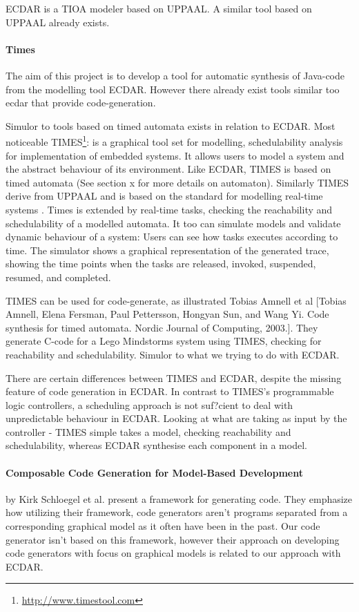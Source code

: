 ECDAR is a TIOA modeler based on UPPAAL. A similar tool based on UPPAAL already
exists.

\paragraph{Times}
The aim of this project is to develop a tool for automatic synthesis of Java-code from the modelling tool ECDAR. However there already exist tools similar too ecdar that provide code-generation.

Simulor to tools based on timed automata exists in relation to ECDAR. Most noticeable TIMES\footnote{\url{http://www.timestool.com}}: is a graphical tool set for modelling, schedulability analysis for implementation of embedded systems. It allows users to model a system and the abstract behaviour of its environment. 
Like ECDAR, TIMES is based on timed automata (See section x for more details on automaton). Similarly TIMES derive from UPPAAL and is based on the standard for modelling real-time systems \cite{Alur1994:183}.
Times is extended by real-time tasks, checking the reachability and schedulability of a modelled automata. It too can simulate models and validate dynamic behaviour of a system: Users can see how tasks executes according to time. The simulator shows a graphical representation of the generated trace, showing the time points when the tasks are released, invoked, suspended, resumed, and completed.

TIMES can be used for code-generate, as illustrated Tobias Amnell et al [Tobias Amnell, Elena Fersman, Paul Pettersson, Hongyan Sun, and Wang Yi. Code
synthesis for timed automata. Nordic Journal of Computing, 2003.]. They generate C-code for a Lego Mindstorms system using TIMES, checking for reachability and schedulability. Simulor to what we trying to do with ECDAR. 



There are certain differences between TIMES and ECDAR, despite the missing feature of code generation in ECDAR. In contrast to TIMES's programmable logic controllers, a scheduling approach is not suf?cient to deal with unpredictable behaviour in ECDAR.
Looking at what are taking as input by the controller - TIMES simple takes a model, checking reachability and schedulability, whereas ECDAR synthesise each component in a model.



\paragraph{Composable Code Generation for Model-Based Development}
by Kirk Schloegel et al. present a framework for generating
code\cite{composable-code-generation}. They emphasize how utilizing their
framework, code generators aren't programs separated from a corresponding
graphical model as it often have been in the past. Our code generator isn't
based on this framework, however their approach on developing code generators
with focus on graphical models is related to our approach with ECDAR.

